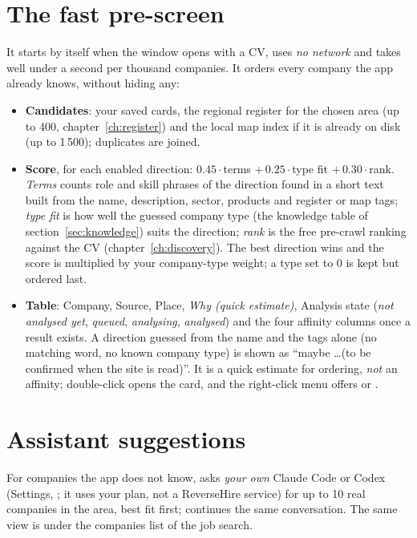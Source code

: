 \section{The fast pre-screen}\label{sec:prescreen}
It starts by itself when the window opens with a CV, uses \emph{no network} and takes well under a
second per thousand companies. It orders every company the app already knows, without hiding any:
\begin{itemize}
  \item \textbf{Candidates}: your saved cards, the regional register for the chosen area (up to 400,
        chapter~\ref{ch:register}) and the local map index if it is already on disk (up to 1\,500);
        duplicates are joined.
  \item \textbf{Score}, for each enabled direction: $0.45\cdot$terms $+\,0.25\cdot$type fit $+\,0.30\cdot$rank.
        \emph{Terms} counts role and skill phrases of the direction found in a short text built from the
        name, description, sector, products and register or map tags; \emph{type fit} is how well the
        guessed company type (the knowledge table of section~\ref{sec:knowledge}) suits the direction; \emph{rank}
        is the free pre-crawl ranking against the CV (chapter~\ref{ch:discovery}). The best direction wins and
        the score is multiplied by your company-type weight; a type set to 0 is kept but ordered last.
  \item \textbf{Table}: Company, Source, Place, \emph{Why (quick estimate)}, Analysis state (\emph{not
        analysed yet}, \emph{queued}, \emph{analysing}, \emph{analysed}) and the four affinity columns once a
        result exists. A direction guessed from the name and the tags alone (no matching word, no known company type) is
        shown as ``maybe \ldots (to be confirmed when the site is read)''. It is a quick estimate for ordering, \emph{not} an affinity; double-click opens the
        card, and the right-click menu offers  or .
\end{itemize}

\section{Assistant suggestions}\label{sec:suggest}
For companies the app does not know,  asks \emph{your own}
Claude Code or Codex (Settings, ; it uses your plan, not a ReverseHire service) for
up to 10 real companies in the area, best fit first;  continues the same conversation. The
same view is under the companies list of the job search.

